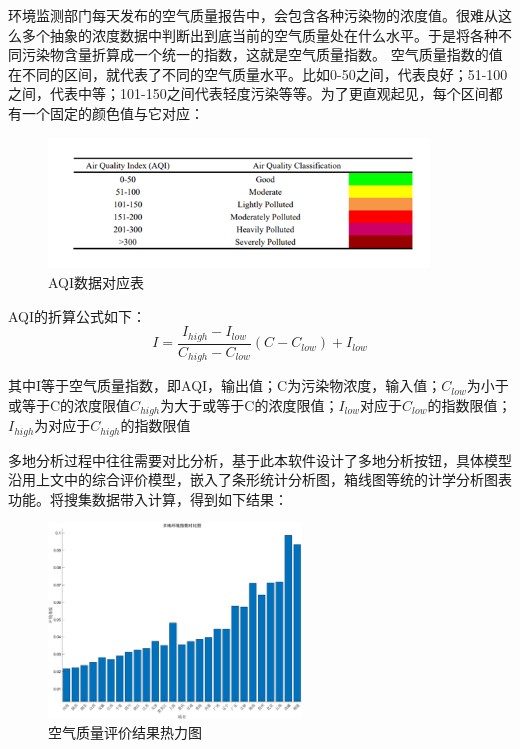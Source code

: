 \documentclass[UTF8]{ctexart}
\begin{document}
环境监测部门每天发布的空气质量报告中，会包含各种污染物的浓度值。很难从这么多个抽象的浓度数据中判断出到底当前的空气质量处在什么水平。于是将各种不同污染物含量折算成一个统一的指数，这就是空气质量指数。 空气质量指数的值在不同的区间，就代表了不同的空气质量水平。比如0-50之间，代表良好；51-100之间，代表中等；101-150之间代表轻度污染等等。为了更直观起见，每个区间都有一个固定的颜色值与它对应：

\begin{figure}[H] %
    \centering %
    \includegraphics[width=0.9\textwidth]{./picture/biaoge2.png} %
    \caption{AQI数据对应表} 
\end{figure}

AQI的折算公式如下：
\begin{equation}
    I=\frac{I_{high}-I_{low}}{C_{high}-C_{low}}(C-C_{low})+I_{low}
\end{equation}

其中I等于空气质量指数，即AQI，输出值；C为污染物浓度，输入值；$C_{low}$为小于或等于C的浓度限值$C_{high}$为大于或等于C的浓度限值；$I_{low}$对应于$C_{low}$的指数限值；$I_{high}$为对应于$C_{high}$的指数限值

多地分析过程中往往需要对比分析，基于此本软件设计了多地分析按钮，具体模型沿用上文中的综合评价模型，嵌入了条形统计分析图，箱线图等统的计学分析图表功能。将搜集数据带入计算，得到如下结果：

\begin{figure}[H] %
    \centering %
    \includegraphics[width=0.6\textwidth]{./picture/geshengpaiming.png} %
    \caption{空气质量评价结果热力图} 
\end{figure}
\end{document}
